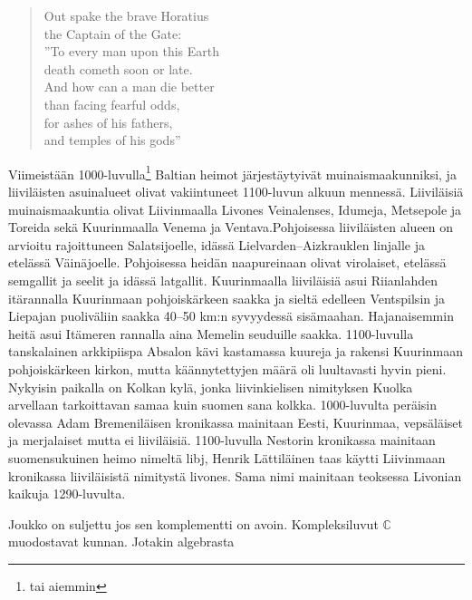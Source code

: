 \documentclass[a4paper]{article}
\theoremstyle{definition}
\theoremstyle{remark}
\newcommand{\C}{\mathbb{C}}
\begin{document}
\begin{verse}
Out spake the brave Horatius\\
the Captain of the Gate:\\
''To every man upon this Earth\\
death cometh soon or late.\\
And how can a man die better \\
than facing fearful odds, \\
for ashes of his fathers,\\
and temples of his gods''
\end{verse}

Viimeistään 1000-luvulla\footnote{tai aiemmin} Baltian heimot järjestäytyivät muinaismaakunniksi, ja liiviläisten asuinalueet olivat vakiintuneet 1100-luvun alkuun mennessä. Liiviläisiä muinaismaakuntia olivat Liivinmaalla Livones Veinalenses, Idumeja, Metsepole ja Toreida sekä Kuurinmaalla Venema ja Ventava.Pohjoisessa liiviläisten alueen on arvioitu rajoittuneen Salatsijoelle, idässä Lielvarden–Aizkrauklen linjalle ja etelässä Väinäjoelle. Pohjoisessa heidän naapureinaan olivat virolaiset, etelässä semgallit ja seelit ja idässä latgallit. Kuurinmaalla liiviläisiä asui Riianlahden itärannalla Kuurinmaan pohjoiskärkeen saakka ja sieltä edelleen Ventspilsin ja Liepajan puoliväliin saakka 40–50 km:n syvyydessä sisämaahan. Hajanaisemmin heitä asui Itämeren rannalla aina Memelin seuduille saakka. 1100-luvulla tanskalainen arkkipiispa Absalon kävi kastamassa kuureja ja rakensi Kuurinmaan pohjoiskärkeen kirkon, mutta käännytettyjen määrä oli luultavasti hyvin pieni. Nykyisin paikalla on Kolkan kylä, jonka liivinkielisen nimityksen Kuolka arvellaan tarkoittavan samaa kuin suomen sana kolkka. 1000-luvulta peräisin olevassa Adam Bremeniläisen kronikassa mainitaan Eesti, Kuurinmaa, vepsäläiset ja merjalaiset mutta ei liiviläisiä. 1100-luvulla Nestorin kronikassa mainitaan suomensukuinen heimo nimeltä libj, Henrik Lättiläinen taas käytti Liivinmaan kronikassa liiviläisistä nimitystä livones. Sama nimi mainitaan teoksessa Livonian kaikuja 1290-luvulta.

Joukko on suljettu jos sen komplementti on avoin. \cite{topo1} Kompleksiluvut $\C$ muodostavat kunnan. \cite{rudin} Jotakin algebrasta \cite{kemper}




\end{document}
